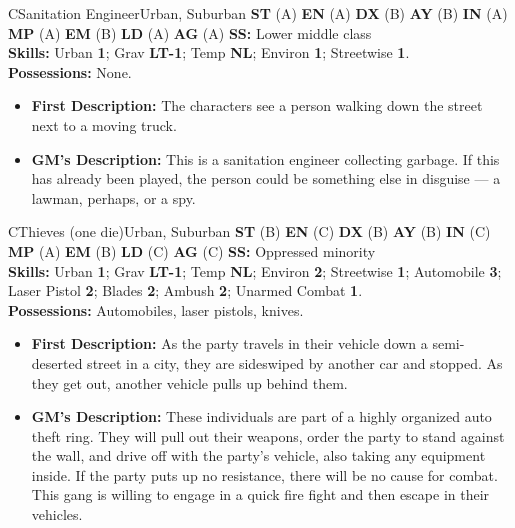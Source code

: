 \hrulefill

\begin{npc}{C}{Sanitation Engineer}{Urban, Suburban}
\textbf{ST} (A) \textbf{EN} (A) \textbf{DX} (B) \textbf{AY} (B) \textbf{IN} (A) \textbf{MP} (A) \textbf{EM} (B) \textbf{LD} (A) \textbf{AG} (A) \textbf{SS:} Lower middle class \\
\textbf{Skills:} Urban \textbf{1}; Grav \textbf{LT-1}; Temp  \textbf{NL}; Environ \textbf{1}; Streetwise \textbf{1}. \\
\textbf{Possessions:} None. 
\begin{itemize}
\item \textbf{First Description:} The characters see a person walking down the street next to a moving truck. 
\item \textbf{GM's Description:} This is a sanitation engineer collecting garbage. If this has already been played, the person could be something 
else in disguise --- a lawman, perhaps, or a spy. 
\end{itemize}
\end{npc}

\hrulefill

\begin{npc}{C}{Thieves (one die)}{Urban, Suburban}
\textbf{ST} (B) \textbf{EN} (C) \textbf{DX} (B) \textbf{AY} (B) \textbf{IN} (C) \textbf{MP} (A) \textbf{EM} (B) \textbf{LD} (C) \textbf{AG} (C) \textbf{SS:} Oppressed minority \\
\textbf{Skills:} Urban \textbf{1}; Grav \textbf{LT-1}; Temp  \textbf{NL}; Environ \textbf{2}; Streetwise \textbf{1}; Automobile \textbf{3}; Laser Pistol \textbf{2}; Blades \textbf{2}; Ambush \textbf{2}; 
Unarmed Combat \textbf{1}. \\
\textbf{Possessions:} Automobiles, laser pistols, knives. 
\begin{itemize}
\item \textbf{First Description:} As the party travels in their vehicle down a semi-deserted street in a city, they are sideswiped by another car and 
stopped. As they get out, another vehicle pulls up behind them. 
\item \textbf{GM's Description:} These individuals are part of a highly organized auto theft ring. They will pull out their weapons, order the party to 
stand against the wall, and drive off with the party's vehicle, also taking any equipment inside. If the party puts up no resistance, there 
will be no cause for combat. This gang is willing to engage in a quick fire fight and then escape in their vehicles. 
\end{itemize}
\end{npc}

